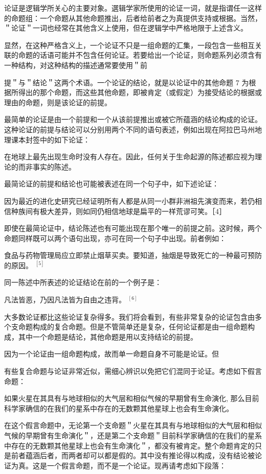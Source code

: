 论证是逻辑学所关心的主要对象。選辑学家所使用的论证一词，就是指谓任一这样的命题组：一个命题从其他命题推出，后者给前者之为真提供支持或根据。当然，＂论证＂一词也经常在其他含义上使用，但在逻辑学中严格地限于上述含义。

显然，在这种严格含义上，一个论证不只是一组命题的汇集，一段包含一些相互关联的命题的话语可能并不包含任何论证。若要给出一个论证，则命题系列必须含有一种结构，对这种结构的描述通常要使用＂前

提＂与＂结论＂这两个术语。一个论证的结论，就是以论证中的其他命题 7 为根据所得出的那个命题，而这些其他命题，即被肯定（或假定）为接受结论的根据或理由的命题，则是该论证的前提。

最简单的论证是由一个前提和一个从该前提推出或被它所蕴涵的结论构成的论证。这种论证的前提与结论可以分别用两个不同的语句表述，例如出现在阿拉巴马州地理课本封签中的如下论证：

在地球上最先出现生命时没有人存在。因此，任何关于生命起源的陈述都应视为理论的而非事实的陈述。

最简论证的前提和结论也可能被表述在同一个句子中，如下述论证：

因为最近的进化史研究已经证明所有人都是从同一小群非洲祖先演变而来，若仍相信种族间有极大差异，则如同仍相信地球是扁平的一样荒谬可笑。［4］

即使在最简论证中，结论陈述也有可能出现在那个唯一的前提之前。这时候，两个命题同样既可以两个语句出现，亦可在同一个句子中出现。前者例如：

食品与药物管理局应立即禁止烟草买卖。要知道，抽烟是导致死亡的一种最可预防的原因。 ${ }^{[5]}$

同一陈述中所表述的论证结论在前的一个例子是：

凡法皆恶，乃因凡法皆为自由之违背。 ${ }^{[6]}$

大多数论证都比这些论证复杂得多。我们将会看到，有些非常复杂的论证包含由多个支命题构成的复合命题。但是不管简单还是复杂，任何论证都是由一组命题构成，其中一个命题是结论，其他命题是用以支持结论的前提。

因为一个论证由一组命题构成，故而单一命题自身不可能是论证。但

有些复合命题与论证非常近似，需细心辨识以免把它们混同于论证。考虑如下假言命题：

\begin{displayquote}
如果火星在其具有与地球相似的大气层和相似气候的早期曾有生命演化, 那么目前科学家确信的在我们的星系中存在的无数颗其他星球上也会有生命演化。
\end{displayquote}

在这个假言命题中，无论第一个支命题＂火星在其具有与地球相似的大气层和相似气候的早期曾有生命演化＂，还是第二个支命题＂目前科学家确信的在我们的星系中存在的无数颗其他星球上也会有生命演化＂，都没有被肯定。整个命题肯定的只是前者蕴涵后者，而两者却可以都是假的。其中没有推论得以构成，没有结论被论证为真。这是一个假言命题，而不是一个论证。现再请考虑如下段落：

